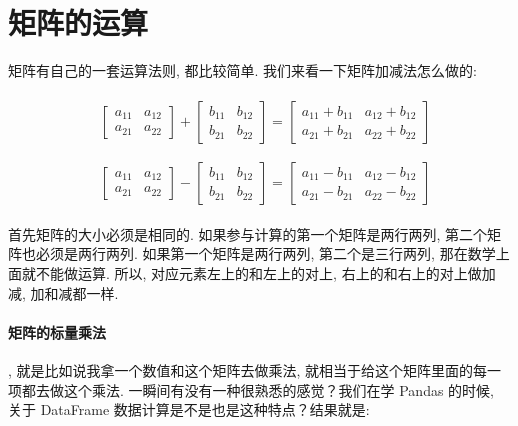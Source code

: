 \section{矩阵的运算}

矩阵有自己的一套运算法则, 都比较简单. 我们来看一下矩阵加减法怎么做的:

\begin{align*}
  & \begin{split} \begin{bmatrix} a_{11} & a_{12} \\ a_{21} & a_{22} \end{bmatrix} + \begin{bmatrix} b_{11} & b_{12} \\ b_{21} & b_{22} \end{bmatrix}=\begin{bmatrix} a_{11}+b_{11} & a_{12}+b_{12} \\ a_{21}+b_{21} & a_{22}+b_{22} \end{bmatrix} \end{split} \\ \\
  & \begin{split} \begin{bmatrix} a_{11} & a_{12} \\ a_{21} & a_{22} \end{bmatrix} - \begin{bmatrix} b_{11} & b_{12} \\ b_{21} & b_{22} \end{bmatrix}=\begin{bmatrix} a_{11}-b_{11} & a_{12}-b_{12} \\ a_{21}-b_{21} & a_{22}-b_{22} \end{bmatrix} \end{split}
\end{align*}

首先矩阵的大小必须是相同的. 如果参与计算的第一个矩阵是两行两列, 第二个矩阵也必须是两行两列. 如果第一个矩阵是两行两列, 第二个是三行两列, 那在数学上面就不能做运算. 所以, 对应元素左上的和左上的对上, 右上的和右上的对上做加减, 加和减都一样. 

\paragraph{矩阵的标量乘法}, 就是比如说我拿一个数值和这个矩阵去做乘法, 就相当于给这个矩阵里面的每一项都去做这个乘法. 一瞬间有没有一种很熟悉的感觉？我们在学 Pandas 的时候, 关于 DataFrame 数据计算是不是也是这种特点？结果就是:

